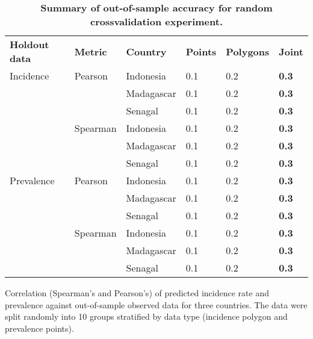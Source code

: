 \documentclass[10pt,letterpaper]{article}
\newlength\savedwidth
\newcommand\thickhline{\noalign{\global\savedwidth\arrayrulewidth\global\arrayrulewidth 2pt}%
\hline
\noalign{\global\arrayrulewidth\savedwidth}}
\begin{document}
\begin{table}[!ht]
\begin{adjustwidth}{-2.25in}{0in} %
\centering
\caption{
{\bf Summary of out-of-sample accuracy for random crossvalidation experiment.}}
\begin{tabular}{llllll}
\hline
{\bf Holdout data} & {\bf Metric} & {\bf Country} &  {\bf Points} & {\bf Polygons} & {\bf Joint} \\
\thickhline 
Incidence & Pearson & Indonesia & 0.1 & 0.2 & {\bf 0.3}\\
                   && Madagascar & 0.1 & 0.2 & {\bf 0.3}\\
                   && Senagal & 0.1 & 0.2 & {\bf 0.3}\vspace{1mm}\\ 
          & Spearman & Indonesia & 0.1 & 0.2 & {\bf 0.3}\\
                   && Madagascar & 0.1 & 0.2 & {\bf 0.3}\\
                   && Senagal & 0.1 & 0.2 & {\bf 0.3}\vspace{3mm} \\ 
Prevalence & Pearson & Indonesia & 0.1 & 0.2 & {\bf 0.3}\\
                   && Madagascar & 0.1 & 0.2 & {\bf 0.3}\\
                   && Senagal & 0.1 & 0.2 & {\bf 0.3}\vspace{1mm}\\ 
            & Spearman & Indonesia & 0.1 & 0.2 & {\bf 0.3}\\
                   && Madagascar & 0.1 & 0.2 & {\bf 0.3}\\
                   && Senagal & 0.1 & 0.2 & {\bf 0.3}\\
\end{tabular}
\begin{flushleft}
Correlation (Spearman's and Pearson's) of predicted incidence rate and prevalence against out-of-sample observed data for three countries.
The data were split randomly into 10 groups stratified by data type (incidence polygon and prevalence points).
\end{flushleft}
\label{table1}
\end{adjustwidth}
\end{table}
\end{document}

